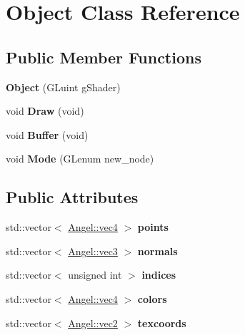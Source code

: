 \hypertarget{class_object}{\section{Object Class Reference}
\label{class_object}
}
\subsection*{Public Member Functions}
\begin{DoxyCompactItemize}
\item 
\hypertarget{class_object_a3413a6e74fe207a67fdc3bc9806844cd}{{\bfseries Object} (G\-Luint g\-Shader)}\label{class_object_a3413a6e74fe207a67fdc3bc9806844cd}

\item 
\hypertarget{class_object_a3afa1b9af32b78d81b5de0836c511aeb}{void {\bfseries Draw} (void)}\label{class_object_a3afa1b9af32b78d81b5de0836c511aeb}

\item 
\hypertarget{class_object_a35c89a8eb8a5b742a9025331119bfc7c}{void {\bfseries Buffer} (void)}\label{class_object_a35c89a8eb8a5b742a9025331119bfc7c}

\item 
\hypertarget{class_object_ac6ccf69d21c4c902c62829c48ef6cf5b}{void {\bfseries Mode} (G\-Lenum new\-\_\-node)}\label{class_object_ac6ccf69d21c4c902c62829c48ef6cf5b}

\end{DoxyCompactItemize}
\subsection*{Public Attributes}
\begin{DoxyCompactItemize}
\item 
\hypertarget{class_object_a8dec70177d147f59ba10c9eba8e9191b}{std\-::vector$<$ \hyperlink{struct_angel_1_1vec4}{Angel\-::vec4} $>$ {\bfseries points}}\label{class_object_a8dec70177d147f59ba10c9eba8e9191b}

\item 
\hypertarget{class_object_ad541a7bb180e24f59d752cc6d7f8c7e8}{std\-::vector$<$ \hyperlink{struct_angel_1_1vec3}{Angel\-::vec3} $>$ {\bfseries normals}}\label{class_object_ad541a7bb180e24f59d752cc6d7f8c7e8}

\item 
\hypertarget{class_object_a9b2fb19d129ad79407f9af0eea05b96c}{std\-::vector$<$ unsigned int $>$ {\bfseries indices}}\label{class_object_a9b2fb19d129ad79407f9af0eea05b96c}

\item 
\hypertarget{class_object_a4de4c1e2c4b621efb6f5d1b398ac6835}{std\-::vector$<$ \hyperlink{struct_angel_1_1vec4}{Angel\-::vec4} $>$ {\bfseries colors}}\label{class_object_a4de4c1e2c4b621efb6f5d1b398ac6835}

\item 
\hypertarget{class_object_a6d6c58ccb93f7a2bd7439d081134aaa0}{std\-::vector$<$ \hyperlink{struct_angel_1_1vec2}{Angel\-::vec2} $>$ {\bfseries texcoords}}\label{class_object_a6d6c58ccb93f7a2bd7439d081134aaa0}

\end{DoxyCompactItemize}
